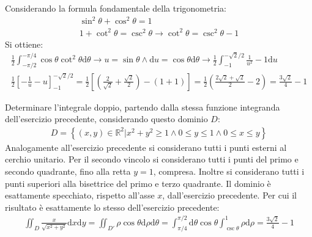 \documentclass{article}
\newcommand{\df}{\mathrm{d}}
\numberwithin{equation}{subsection}
\begin{document}
Considerando la formula fondamentale della trigonometria:
\begin{gather*}
    \sin^2\theta+\cos^2\theta=1\\
    1+\cot^2\theta=\csc^2\theta\to\cot^2\theta=\csc^2\theta-1
\end{gather*}
Si ottiene:
\begin{gather*}
    \frac{1}{2}\int_{-\pi/2}^{-\pi/4}\cos\theta\cot^2\theta\df\theta\to
    u=\sin\theta\land \df u =\cos\theta\df\theta\to
    \frac{1}{2}\int_{-1}^{-\sqrt{2}/2}\frac{1}{u^2}-1\df u\\
    \frac{1}{2}\left[-\frac{1}{u}-u\right]_{-1}^{-\sqrt{2}/2}=\frac{1}{2}\left[\left(\frac{2}{\sqrt{2}}+\frac{\sqrt{2}}{2}\right)-\left(1+1\right)\right]=\frac{1}{2}\left(\frac{2\sqrt{2}+\sqrt{2}}{2}-2\right)=\frac{3\sqrt{2}}{4}-1
\end{gather*}


Determinare l'integrale doppio, partendo dalla stessa funzione integranda dell'esercizio precedente, considerando questo dominio $D$:
\begin{gather*}
    D=\left\{(x,y)\in\mathbb{R}^2\big| x^2+y^2\geq1\land 0\leq y\leq 1\land 0\leq x \leq y\right\}
\end{gather*}
Analogamente all'esercizio precedente si considerano tutti i punti esterni al cerchio unitario. Per il secondo vincolo si considerano tutti i punti del primo e secondo quadrante, fino alla retta $y=1$, compresa. Inoltre si considerano tutti i punti superiori alla bisettrice del primo e terzo quadrante. Il dominio è esattamente specchiato, rispetto all'asse $x$, dall'esercizio precedente. 
Per cui il risultato è esattamente lo stesso dell'esercizio precedente:
\begin{gather*}
    \iint_D\frac{x}{\sqrt{x^2+y^2}}\df x\df y=
    \iint_{D'}\rho\cos\theta\df\rho\df\theta=
    \int_{\pi/4}^{\pi/2}\df\theta\cos\theta\int_{\csc\theta}^1\rho\df\rho=
    \frac{3\sqrt{2}}{4}-1
\end{gather*}
\end{document}
